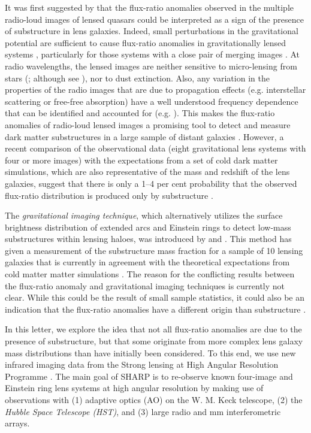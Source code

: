 \documentclass[a4paper,fleqn,usenatbib,useAMS]{mnras}
\begin{document}
It was first suggested by \citet{Mao1998} that the flux-ratio anomalies observed in the multiple radio-loud images of lensed quasars could be interpreted as a sign of the presence of substructure in lens galaxies. Indeed, small perturbations in the gravitational potential are sufficient to cause flux-ratio anomalies in gravitationally lensed systems \citep{metcalf01,Dalal2002,Bradac02}, particularly for those systems with a close pair of merging images \citep{KD04}. At radio wavelengths, the lensed images are neither sensitive to micro-lensing from stars (\citealt{K03}; although see \citealt{koopmans00}), nor to dust extinction. Also, any variation in the properties of the radio images that are due to propagation effects (e.g. interstellar scattering or free-free absorption) have a well understood frequency dependence that can be identified and accounted for (e.g. \citealt{biggs03,M07,winn04}). This makes the flux-ratio anomalies of radio-loud lensed images a promising tool to detect and measure dark matter substructures in a large sample of distant galaxies \citep{Dalal2002}. However, a recent comparison of the observational data (eight gravitational lens systems with four or more images) with the expectations from a set of cold dark matter simulations, which are also representative of the mass and redshift of the lens galaxies, suggest that there is only a 1--4 per cent probability that the observed flux-ratio distribution is produced only by substructure \citep{Xu15}.

The \emph{gravitational imaging technique}, which alternatively utilizes the surface brightness distribution of extended arcs and Einstein rings to detect low-mass substructures within lensing haloes, was introduced by \citet{K05} and \citet{V09}. This method has given a measurement of the substructure mass fraction for a sample of 10 lensing galaxies that is currently in agreement with the theoretical expectations from cold matter matter simulations \citep{V14a,V12}. The reason for the conflicting results between the flux-ratio anomaly and gravitational imaging techniques is currently not clear.  While this could be the result of small sample statistics, it could also be an indication that the flux-ratio anomalies have a different origin than substructure \citep[see][for a discussion]{Xu15}.

 
In this letter, we explore the idea that not all flux-ratio anomalies are due to the presence of substructure, but that some originate from more complex lens galaxy mass distributions than have initially been considered. To this end, we use new infrared imaging data from the Strong lensing at High Angular Resolution Programme \citep[SHARP;][]{mckean07,lagattuta10,SHARP12, V12}. The main goal of SHARP is to re-observe known four-image and Einstein ring lens systems at high angular resolution by making use of observations with (1) adaptive optics (AO) on the W. M. Keck telescope, (2) the {\it Hubble Space Telescope (HST)}, and (3) large radio and mm interferometric arrays. 
\end{document}
